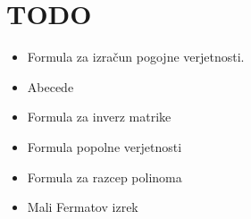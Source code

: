\section{TODO}
\begin{itemize}
    \item Formula za izračun pogojne verjetnosti.
    \item Abecede
    \item Formula za inverz matrike
    \item Formula popolne verjetnosti
    \item Formula za razcep polinoma
    \item Mali Fermatov izrek
\end{itemize}